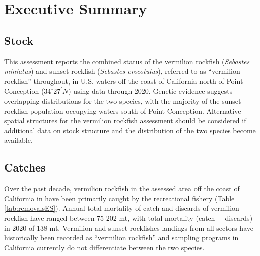 \documentclass[11pt,
  english,
  a4paper,
]{article}
\begin{document}
\hypertarget{executive-summary}{%
\section*{Executive Summary}\label{executive-summary}}

\leavevmode\tagmcend\tagstructend


\hypertarget{stock}{%
\subsection*{Stock}\label{stock}}

\leavevmode\tagmcend\tagstructend

This assessment reports the combined status of the vermilion rockfish (\emph{Sebastes miniatus}) and sunset rockfish (\emph{Sebastes crocotulus}), referred to as ``vermilion rockfish'' throughout, in U.S. waters off the coast of California north of Point Conception ($34^\circ 27^\prime N$) using data through 2020. Genetic evidence suggests overlapping distributions for the two species, with the majority of the sunset rockfish population occupying waters south of Point Conception. Alternative spatial structures for the vermilion rockfish assessment should be considered if additional data on stock structure and the distribution of the two species become available.


\hypertarget{catches}{%
\subsection*{Catches}\label{catches}}

\leavevmode\tagmcend\tagstructend

Over the past decade, vermilion rockfish in the assessed area off the coast of California in have been primarily caught by the recreational fishery (Table \ref{tab:removalsES}). Annual total mortality of catch and discards of vermilion rockfish have ranged between 75-202 mt, with total mortality (catch + discards) in 2020 of 138 mt. Vermilion and sunset rockfishes landings from all sectors have historically been recorded as ``vermilion rockfish'' and sampling programs in California currently do not differentiate between the two species.
\end{document}
